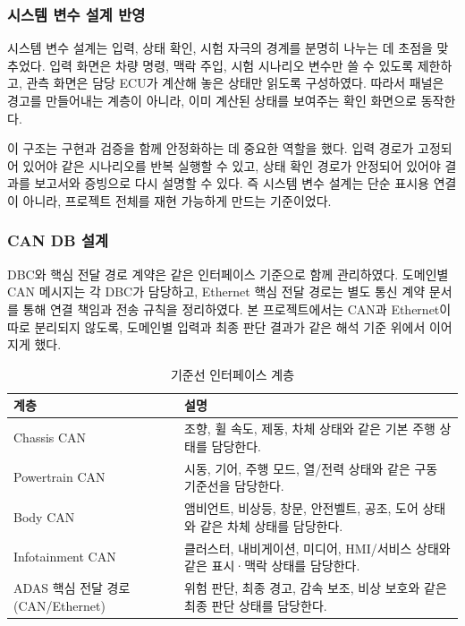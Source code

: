 \documentclass[11pt,a4paper]{article}
\begin{document}
\subsubsection{시스템 변수 설계 반영}
시스템 변수 설계는 입력, 상태 확인, 시험 자극의 경계를 분명히 나누는 데 초점을 맞추었다. 입력 화면은 차량 명령, 맥락 주입, 시험 시나리오 변수만 쓸 수 있도록 제한하고, 관측 화면은 담당 ECU가 계산해 놓은 상태만 읽도록 구성하였다. 따라서 패널은 경고를 만들어내는 계층이 아니라, 이미 계산된 상태를 보여주는 확인 화면으로 동작한다.

이 구조는 구현과 검증을 함께 안정화하는 데 중요한 역할을 했다. 입력 경로가 고정되어 있어야 같은 시나리오를 반복 실행할 수 있고, 상태 확인 경로가 안정되어 있어야 결과를 보고서와 증빙으로 다시 설명할 수 있다. 즉 시스템 변수 설계는 단순 표시용 연결이 아니라, 프로젝트 전체를 재현 가능하게 만드는 기준이었다.

\subsubsection{CAN DB 설계}
DBC와 핵심 전달 경로 계약은 같은 인터페이스 기준으로 함께 관리하였다. 도메인별 CAN 메시지는 각 DBC가 담당하고, Ethernet 핵심 전달 경로는 별도 통신 계약 문서를 통해 연결 책임과 전송 규칙을 정리하였다. 본 프로젝트에서는 CAN과 Ethernet이 따로 분리되지 않도록, 도메인별 입력과 최종 판단 결과가 같은 해석 기준 위에서 이어지게 했다.

\begin{table}[H]
\centering
\begin{tabularx}{\textwidth}{|p{34mm}|X|}
\hline
\textbf{계층} & \textbf{설명} \\ \hline
Chassis CAN & 조향, 휠 속도, 제동, 차체 상태와 같은 기본 주행 상태를 담당한다. \\ \hline
Powertrain CAN & 시동, 기어, 주행 모드, 열/전력 상태와 같은 구동 기준선을 담당한다. \\ \hline
Body CAN & 앰비언트, 비상등, 창문, 안전벨트, 공조, 도어 상태와 같은 차체 상태를 담당한다. \\ \hline
Infotainment CAN & 클러스터, 내비게이션, 미디어, HMI/서비스 상태와 같은 표시·맥락 상태를 담당한다. \\ \hline
ADAS 핵심 전달 경로(CAN/Ethernet) & 위험 판단, 최종 경고, 감속 보조, 비상 보호와 같은 최종 판단 상태를 담당한다. \\ \hline
\end{tabularx}
\caption{기준선 인터페이스 계층}
\end{table}
\end{document}
